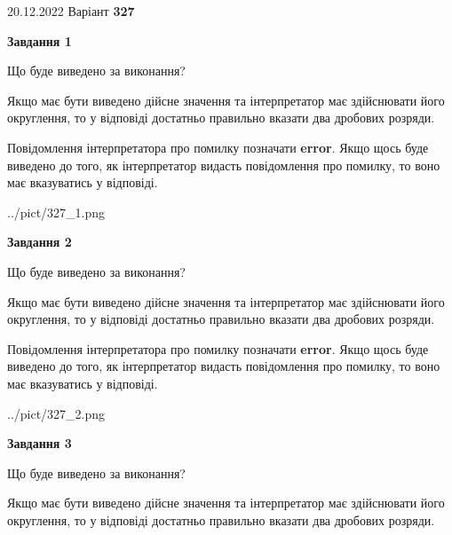 \documentclass[12pt, ukrainian]{article}
\begin{document}
{20.12.2022 Варіант \No \textbf { 327 }\par}
{
\begin {Large}

{\begin {center}\textbf{Завдання 1}\end {center}}\par
Що буде виведено за виконання? \par

Якщо має бути виведено дійсне значення та інтерпретатор має здійснювати його округлення, 
то у відповіді достатньо правильно вказати два дробових розряди.

Повідомлення інтерпретатора про помилку позначати \textbf{error}.
Якщо щось буде виведено до того, як інтерпретатор видасть повідомлення про помилку, 
то воно має вказуватись у відповіді. \par

\begin{center}
	{../pict/327_1.png}
\end{center}
\newpage

{\begin {center}\textbf{Завдання 2}\end {center}}\par
Що буде виведено за виконання? \par

Якщо має бути виведено дійсне значення та інтерпретатор має здійснювати його округлення, 
то у відповіді достатньо правильно вказати два дробових розряди.

Повідомлення інтерпретатора про помилку позначати \textbf{error}.
Якщо щось буде виведено до того, як інтерпретатор видасть повідомлення про помилку, 
то воно має вказуватись у відповіді. \par

\begin{center}
	{../pict/327_2.png}
\end{center}
\newpage

{\begin {center}\textbf{Завдання 3}\end {center}}\par
Що буде виведено за виконання? \par

Якщо має бути виведено дійсне значення та інтерпретатор має здійснювати його округлення, 
то у відповіді достатньо правильно вказати два дробових розряди.


\end{Large}}
\end{document}
